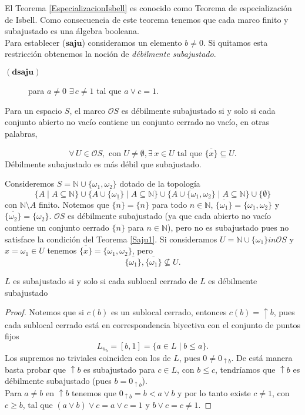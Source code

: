 El Teorema \ref{EspecializacionIsbell} es conocido como Teorema de especialización de Isbell. Como consecuencia de este teorema tenemos que cada marco finito y subajustado es una álgebra booleana.\\

Para establecer ($\textbf{saju}$) consideramos un elemento $b\neq 0$. Si quitamos esta restricción obtenemos la noción de \emph{débilmente subajustado}.

\begin{description}
    \item[$(\textbf{dsaju})$] para $a\neq 0$ $\exists\, c\neq 1$ tal que $a\vee c=1$.
\end{description}

Para un espacio $S$, el marco $\mathcal{O}S$ es débilmente subajustado si y solo si cada conjunto abierto no vacío contiene un conjunto cerrado no vacío, en otras palabras,

\[
\forall\, U\in \mathcal{O}S, \mbox{ con } U\neq \emptyset, \exists\, x\in U \mbox{ tal que } \overline{\{x\}}\subseteq U.
\]
Débilmente subajustado es más débil que subajustado.

\begin{ej}
    Consideremos $S=\mathbb{N}\cup \{\omega_1, \omega_2\}$ dotado de la topología 
    \[
    \{A\mid A\subseteq \mathbb{N}\}\cup \{A\cup \{\omega_1\}\mid A\subseteq \mathbb{N}\}\cup \{A\cup \{\omega_1,\omega_2\}\mid A\subseteq \mathbb{N}\}\cup \{\emptyset\}
    \]
    con $\mathbb{N}\setminus A$ finito. Notemos que $\overline{\{n\}}=\{n\}$ para todo $n\in \mathbb{N}$, $\overline{\{\omega_1\}}=\{\omega_1, \omega_2\}$ y $\overline{\{\omega_2\}}=\{\omega_2\}$. $\mathcal{O}S$ es débilmente subajustado (ya que cada abierto no vacío contiene un conjunto cerrado $\{n\}$ para $n\in \mathbb{N}$), pero no es subajustado pues no satisface la condición del Teorema \ref{Saju1}. Si consideramos $U=\mathbb{N}\cup \{\omega_1\}in \mathcal{O}S$ y $x=\omega_1\in U$ tenemos $\overline{\{x\}}=\{\omega_1,\omega_2\}$, pero 
    \[
    \overline{\{\omega_1\}}, \overline{\{\omega_1\}}\nsubseteq U.
    \]
\end{ej}

\begin{prop}\label{Dsaju}
    $L$ es subajustado si y solo si cada sublocal cerrado de $L$ es débilmente subajustado 
\end{prop}

\begin{proof}
    Notemos que si $c(b)$ es un sublocal cerrado, entonces $c(b)=\uparrow b$, pues cada sublocal cerrado está en correspondencia biyectiva con el conjunto de puntos fijos 
    \[
    L_{u_b}=[b, 1]=\{a\in L\mid b\leq a\}.
    \]
    Los supremos no triviales coinciden con los de $L$, pues $0\neq 0_{\uparrow b}$. De está manera basta probar que $\uparrow b$ es subajustado para $c\in L$, con $b\leq c$, tendríamos que $\uparrow b$ es débilmente subajustado (pues $b=0_{\uparrow b}$).\\
    
    \noindent
    Para $a\neq b$ en $\uparrow b$ tenemos que $0_{\uparrow b} =b< a\vee b$ y por lo tanto existe $c\neq 1$, con $c\geq b$, tal que $(a\vee b)\vee c=a\vee c=1$ y $b\vee c=c\neq 1$.
\end{proof}

